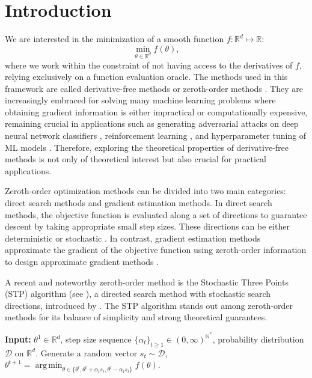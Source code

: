 \documentclass{article} %
\DeclareMathOperator*{\argmin}{arg\,min}
\begin{document}
\section{Introduction}
We are interested in the minimization of a smooth function $f : \mathbb{R}^d \mapsto \mathbb{R}$:
$$\min_{\theta \in \mathbb{R}^d} f(\theta),$$
where we work within the constraint of not having access to the derivatives of 
$f$, relying exclusively on a function evaluation oracle.
 The methods used %
 in this framework are called derivative-free methods or zeroth-order methods \citep{conn2009introduction,ghadimi2013stochastic,nesterov2017random,larson2019derivative,golovin2019gradientless,bergou2020stochastic}. They are increasingly embraced for solving many machine learning problems where obtaining gradient information is either impractical or computationally expensive,  %
 remaining crucial in applications such as generating adversarial attacks on deep neural network classifiers \citep{chen2017zoo,tu2019autozoom}, reinforcement learning \citep{malik2019derivative,salimans2017evolution}, and hyperparameter tuning of ML models \citep{snoek2012practical,turner2021bayesian}. Therefore, exploring the theoretical properties of derivative-free methods is not only of theoretical interest but also crucial for practical applications.


Zeroth-order optimization methods can be divided into two main categories: direct search methods and gradient estimation methods. In direct search methods, the objective function is evaluated along a set of directions to guarantee descent by taking appropriate small step sizes. These directions can be either deterministic \citep{vicente2013worst} or stochastic \citep{golovin2019gradientless,bergou2020stochastic}. In contrast, gradient estimation methods approximate the gradient of the objective function using zeroth-order information to design approximate gradient methods \citep{nesterov2017random,shamir2017optimal}.

A recent and noteworthy zeroth-order method is the Stochastic Three Points (STP) algorithm (see ), a directed search method with stochastic search directions, introduced by \cite{bergou2020stochastic}. The STP algorithm stands out among zeroth-order methods for its balance of simplicity and strong theoretical guarantees.
\begin{algorithm}[H]
  \caption{Stochastic Three Points (STP)}
  \label{alg:stp}\label{Alg1}
  \begin{algorithmic}[1]
    \State \textbf{Input:} $\theta^1 \in \mathbb{R}^d$, step size sequence $\{\alpha_t\}_{t \ge 1} \in  (0,\infty)^{\mathbb{N}^{*} }$, probability distribution $\mathcal{D}$ on $\mathbb{R}^d$.
      \State Generate a random vector $s_t \sim \mathcal{D}$, 
      \State $\theta^{t+1} = \argmin_{\theta  \in \{  \theta^t, \theta^t + \alpha_t s_t,\theta^t - \alpha_t s_t \} } f(\theta)$.
    \EndFor
  \end{algorithmic}
\end{algorithm}
\end{document}

